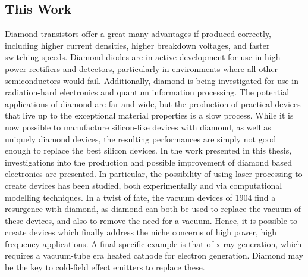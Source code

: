\begin{refsection}
\subsection{This Work}
Diamond transistors offer a great many advantages if produced correctly, including higher current densities, higher breakdown voltages, and faster switching speeds. Diamond diodes are in active development for use in high-power rectifiers and detectors, particularly in environments where all other semiconductors would fail. Additionally, diamond is being investigated for use in radiation-hard electronics and quantum information processing. The potential applications of diamond are far and wide, but the production of practical devices that live up to the exceptional material properties is a slow process. While it is now possible to manufacture silicon-like devices with diamond, as well as uniquely diamond devices, the resulting performances are simply not good enough to replace the best silicon devices. In the work presented in this thesis, investigations into the production and possible improvement of diamond based electronics are presented. In particular, the possibility of using laser processing to create devices has been studied, both experimentally and via computational modelling techniques. In a twist of fate, the vacuum devices of 1904 find a resurgence with diamond, as diamond can both be used to replace the vacuum of these devices, and also to remove the need for a vacuum. Hence, it is possible to create devices which finally address the niche concerns of high power, high frequency applications. A final specific example is that of x-ray generation, which requires a vacuum-tube era heated cathode for electron generation. Diamond may be the key to cold-field effect emitters to replace these.

\printbibliography[heading=subbibliography]

\end{refsection}